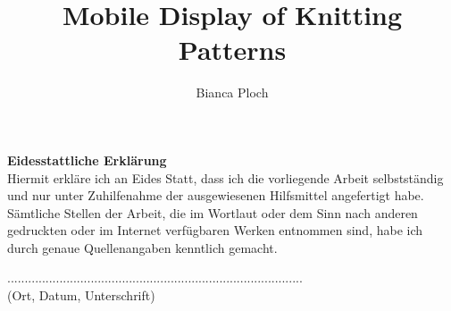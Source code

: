 \documentclass[
  a4paper,
  oneside,
  titlepage,
  11pt
]{memoir}
\author{Bianca Ploch}
\title{Mobile Display of Knitting Patterns}
\begin{document}
\newpage
\thispagestyle{empty}

\noindent \textbf{Eidesstattliche Erklärung}\\

\noindent Hiermit erkläre ich an Eides Statt, dass ich die vorliegende Arbeit selbstständig und nur unter
Zuhilfenahme der ausgewiesenen Hilfsmittel angefertigt habe.
Sämtliche Stellen der Arbeit, die im Wortlaut oder dem Sinn nach anderen gedruckten oder
im Internet verfügbaren Werken entnommen sind, habe ich durch genaue Quellenangaben
kenntlich gemacht.

\vspace*{1.5cm}
\noindent .....................................................................................\\
(Ort, Datum, Unterschrift)
\end{document}
